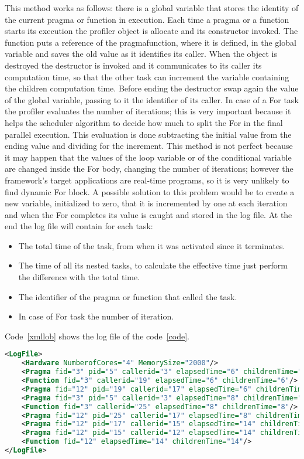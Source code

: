\documentclass[a4paper,11pt,oneside]{book}
\begin{document}
This method works as follows: there is a global variable that stores the identity of the current pragma or function in execution. Each time a pragma or a function starts its execution the profiler object is allocate and its constructor invoked. The function puts a reference of the pragma\/function, where it is defined, in the global variable and saves the old value as it identifies its caller. When the object is destroyed the destructor is invoked and it communicates to its caller its computation time, so that the other task can increment the variable containing the children computation time. Before ending the destructor swap again the value of the global variable, passing to it the identifier of its caller. 
In case of a For task the profiler evaluates the number of iterations; this is very important because it helps the scheduler algorithm to decide how much to split the For in the final parallel execution. This evaluation is done subtracting the initial value from the ending value and dividing for the increment. This method is not perfect because it may happen that the values of the loop variable or of the conditional variable are changed inside the For body, changing the number of iterations; however the framework’s target applications are real-time programs, so it is very unlikely to find dynamic For block. A possible solution to this problem would be to create a new variable, initialized to zero, that it is incremented by one at each iteration and when the For completes its value is caught and stored in the log file. At the end the log file will contain for each task:

\begin{itemize}
\item The total time of the task, from when it was activated since it terminates.
\item The time of all its nested tasks, to calculate the effective time just perform the difference with the total time.
\item The identifier of the pragma or function that called the task.
\item In case of For task the number of iteration.
\end{itemize}

Code~\ref{xmllob} shows the log file of the code~\ref{code}.

\begin{lstlisting}[language=XML, caption=XML file of the pragma structure of Code~\ref{code}., label=xmlpragma]
<LogFile>
	<Hardware NumberofCores="4" MemorySize="2000"/>
	<Pragma fid="3" pid="5" callerid="3" elapsedTime="6" childrenTime="0" loops="6"/>
	<Function fid="3" callerid="19" elapsedTime="6" childrenTime="6"/>
	<Pragma fid="12" pid="19" callerid="17" elapsedTime="6" childrenTime="6"/>
	<Pragma fid="3" pid="5" callerid="3" elapsedTime="8" childrenTime="0" loops="8"/>
	<Function fid="3" callerid="25" elapsedTime="8" childrenTime="8"/>
	<Pragma fid="12" pid="25" callerid="17" elapsedTime="8" childrenTime="8"/>
	<Pragma fid="12" pid="17" callerid="15" elapsedTime="14" childrenTime="14"/>
	<Pragma fid="12" pid="15" callerid="12" elapsedTime="14" childrenTime="14"/>
	<Function fid="12" elapsedTime="14" childrenTime="14"/>
</LogFile>
\end{lstlisting}
\end{document}
